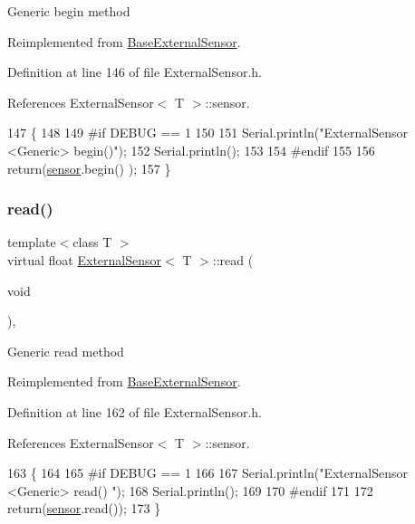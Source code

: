 Generic begin method 

Reimplemented from \hyperlink{classBaseExternalSensor_a87d132803d4f4fdd4e66332809f0c9a0}{Base\+External\+Sensor}.



Definition at line 146 of file External\+Sensor.\+h.



References External\+Sensor$<$ T $>$\+::sensor.


\begin{DoxyCode}
147     \{
148     
149 \textcolor{preprocessor}{    #if DEBUG == 1 }
150 
151         Serial.println(\textcolor{stringliteral}{"ExternalSensor <Generic> begin()"});
152         Serial.println();
153     
154 \textcolor{preprocessor}{    #endif}
155 
156         \textcolor{keywordflow}{return}(\hyperlink{classExternalSensor_a6e1f518119abe08c14b498ce24a7e1b3}{sensor}.begin() );  
157     \}
\end{DoxyCode}
\mbox{\label{classExternalSensor_a5fb3afc7d244fb86dac68ab5481bc407}} 
\subsubsection{\texorpdfstring{read()}{read()}}
{\footnotesize\ttfamily template$<$class T $>$ \\
virtual float \hyperlink{classExternalSensor}{External\+Sensor}$<$ T $>$\+::read (\begin{DoxyParamCaption}\item[{void}]{ }\end{DoxyParamCaption})\hspace{0.3cm}{\ttfamily [inline]}, {\ttfamily [virtual]}}

Generic read method 

Reimplemented from \hyperlink{classBaseExternalSensor_a1564f16deacf57b51b9948ac29db4291}{Base\+External\+Sensor}.



Definition at line 162 of file External\+Sensor.\+h.



References External\+Sensor$<$ T $>$\+::sensor.


\begin{DoxyCode}
163     \{
164     
165 \textcolor{preprocessor}{    #if DEBUG == 1 }
166 
167         Serial.println(\textcolor{stringliteral}{"ExternalSensor <Generic> read() "});
168         Serial.println();
169         
170 \textcolor{preprocessor}{    #endif}
171 
172         \textcolor{keywordflow}{return}(\hyperlink{classExternalSensor_a6e1f518119abe08c14b498ce24a7e1b3}{sensor}.read());
173     \}
\end{DoxyCode}


